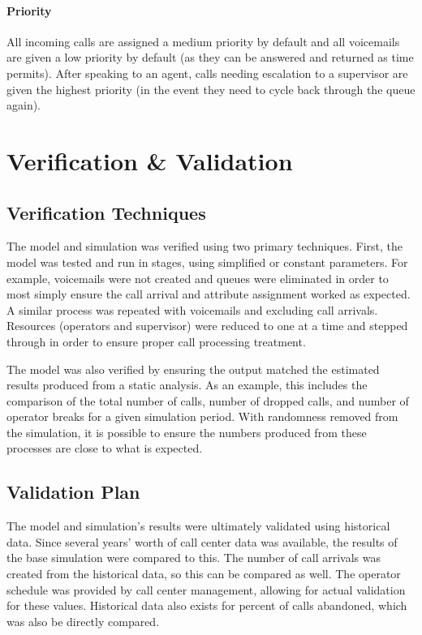 \documentclass[12pt]{article}
\begin{document}
	\paragraph{Priority}

All incoming calls are assigned a medium priority by default and all voicemails are given a low priority by default (as they can be answered and returned as time permits).  After speaking to an agent, calls needing escalation to a supervisor are given the highest priority (in the event they need to cycle back through the queue again).


\section{Verification \& Validation}

	\subsection{Verification Techniques}

The model and simulation was verified using two primary techniques.  First, the model was tested and run in stages, using simplified or constant parameters.  For example, voicemails were not created and queues were eliminated in order to most simply ensure the call arrival and attribute assignment worked as expected.  A similar process was repeated with voicemails and excluding call arrivals.  Resources (operators and supervisor) were reduced to one at a time and stepped through in order to ensure proper call processing treatment.  

\par

The model was also verified by ensuring the output matched the estimated results produced from a static analysis.  As an example, this includes the comparison of the total number of calls, number of dropped calls, and number of operator breaks for a given simulation period.  With randomness removed from the simulation, it is possible to ensure the numbers produced from these processes are close to what is expected.
	
	
	\subsection{Validation Plan}
	
The model and simulation's results were ultimately validated using historical data.  Since several years' worth of call center data was available, the results of the base simulation were compared to this.  The number of call arrivals was created from the historical data, so this can be compared as well.  The operator schedule was provided by call center management, allowing for actual validation for these values.  Historical data also exists for percent of calls abandoned, which was also be directly compared.
	
\end{document}
